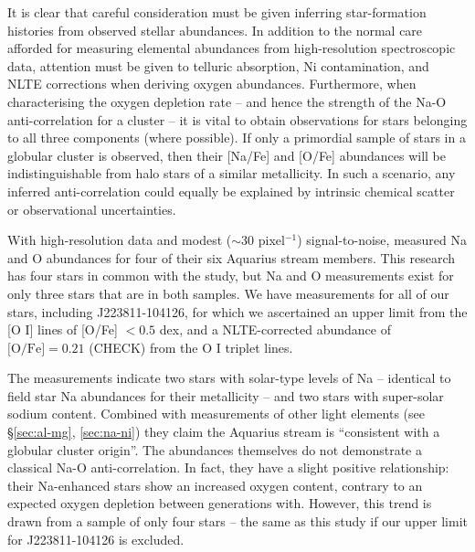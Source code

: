 \documentclass{emulateapj}
\begin{document}
It is clear that careful consideration must be given inferring star-formation histories from observed stellar abundances. In addition to the normal care afforded for measuring elemental abundances from high-resolution spectroscopic data, attention must be given to telluric absorption, Ni contamination, and NLTE corrections when deriving oxygen abundances. Furthermore, when characterising the oxygen depletion rate -- and hence the strength of the Na-O anti-correlation for a cluster -- it is vital to obtain observations for stars belonging to all three components (where possible). If only a primordial sample of stars in a globular cluster is observed, then their [Na/Fe] and [O/Fe] abundances will be indistinguishable from halo stars of a similar metallicity. In such a scenario, any inferred anti-correlation could equally be explained by intrinsic chemical scatter or observational uncertainties.


With high-resolution data and modest ($\sim$30 pixel$^{-1}$) signal-to-noise, \citet{Wylie-de-boer;et-al_2012} measured Na and O abundances for four of their six Aquarius stream members. This research has four stars in common with the \citet{Wylie-de-boer;et-al_2012} study, but Na and O measurements exist for only three stars that are in both samples. We have measurements for all of our stars, including J223811-104126, for which we ascertained an upper limit from the [O \textsc{I}] lines of [O/Fe] $< 0.5$ dex, and a NLTE-corrected abundance of $\mbox{[O/Fe]} = 0.21$ (CHECK) from the O \textsc{I} triplet lines.



The \citet{wylie-de-boer;et-al_20120} measurements indicate two stars with solar-type levels of Na -- identical to field star Na abundances for their metallicity -- and two stars with super-solar sodium content. Combined with measurements of other light elements (see \S\ref{sec:al-mg}, \ref{sec:na-ni}) they claim the Aquarius stream is ``consistent with a globular cluster origin''. The \citet{wylie-de-boer;et-al_2012} abundances themselves do not demonstrate a classical Na-O anti-correlation. In fact, they have a slight positive relationship: their Na-enhanced stars show an increased oxygen content, contrary to an expected oxygen depletion between generations with. However, this trend is drawn from a sample of only four stars -- the same as this study if our upper limit for J223811-104126 is excluded. 
\end{document}
